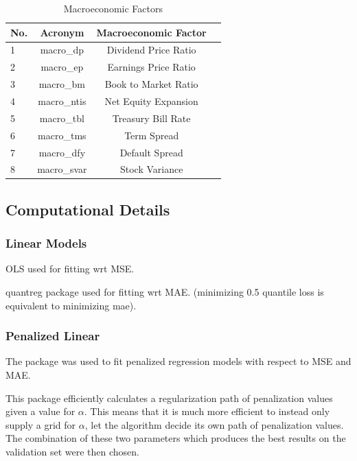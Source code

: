 \documentclass[a4paper, table]{article}
\begin{document}
\begin{table}
	\caption{Macroeconomic Factors}
	\begin{center}
	\begin{tabular}{lccc} \hline \hline
		No. & Acronym & Macroeconomic Factor \\ \hline \hline
		1 & macro\_dp & Dividend Price Ratio \\
		2 & macro\_ep & Earnings Price Ratio \\
		3 & macro\_bm & Book to Market Ratio \\
		4 & macro\_ntis & Net Equity Expansion \\
		5 & macro\_tbl & Treasury Bill Rate \\
		6 & macro\_tms & Term Spread \\
		7 & macro\_dfy & Default Spread \\
		8 & macro\_svar & Stock Variance \\
	\end{tabular}
	\end{center}
\end{table}

\subsection{Computational Details}
\label{Algorithms}

\subsubsection{Linear Models}

OLS used for fitting wrt MSE.

quantreg package used for fitting wrt MAE. (minimizing 0.5 quantile loss is equivalent to minimizing mae).

\subsubsection{Penalized Linear}

The package  was used to fit penalized regression models with respect to MSE and MAE.

This package efficiently calculates a regularization path of penalization values given a value for $\alpha$. This means that it is much more efficient to instead only supply a grid for $\alpha$, let the algorithm decide its own path of penalization values. The combination of these two parameters which produces the best results on the validation set were then chosen.
\end{document}
